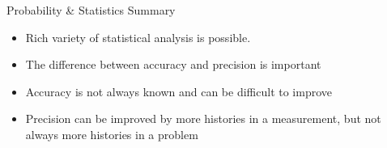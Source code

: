 \documentclass[xcolor=x11names,compress]{beamer}
\renewcommand{\(}{\begin{columns}}
\renewcommand{\)}{\end{columns}}
\newcommand{\<}[1]{\begin{column}{#1}}
\renewcommand{\>}{\end{column}}
\begin{document}
\begin{frame}{Probability \& Statistics Summary}

    \begin{itemize}
    \item Rich variety of statistical analysis is
possible.
\pause
\vspace*{.5em}
    \item The difference between accuracy and
precision is important
\pause
\vspace*{.5em}
    \item Accuracy is not always known and can
be difficult to improve
\pause
\vspace*{.5em}
    \item Precision can be improved by more
histories in a measurement, but not
always more histories in a problem
    \end{itemize}

\end{frame}
\end{document}
